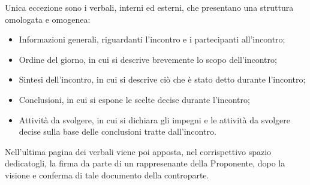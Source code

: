 Unica eccezione sono i verbali, interni ed esterni, che presentano una struttura omologata e omogenea:
\begin{itemize}
    \item Informazioni generali, riguardanti l'incontro e i partecipanti all'incontro;
    \item Ordine del giorno, in cui si descrive brevemente lo scopo dell'incontro;
    \item Sintesi dell'incontro, in cui si descrive ciò che è stato detto durante l'incontro;
    \item Conclusioni, in cui si espone le scelte decise durante l'incontro;
    \item Attività da svolgere, in cui si dichiara gli impegni e le attività da svolgere decise sulla base delle conclusioni tratte dall'incontro.
\end{itemize}
Nell'ultima pagina dei verbali viene poi apposta, nel corrispettivo spazio dedicatogli, la firma da parte di un rappresenante della Proponente, dopo la visione e conferma di tale documento della controparte.

